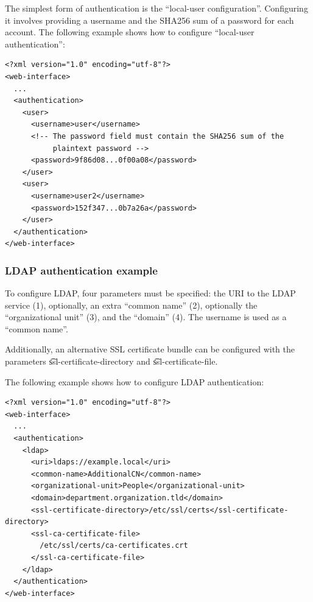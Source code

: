   The simplest form of authentication is the ``local-user configuration''.
  Configuring it involves providing a username and the SHA256 sum of a password
  for each account.  The following example shows how to configure
  ``local-user authentication'':

\begin{siderules}
\begin{verbatim}
<?xml version="1.0" encoding="utf-8"?>
<web-interface>
  ...
  <authentication>
    <user>
      <username>user</username>
      <!-- The password field must contain the SHA256 sum of the
           plaintext password -->
      <password>9f86d08...0f00a08</password>
    </user>
    <user>
      <username>user2</username>
      <password>152f347...0b7a26a</password>
    </user>
  </authentication>
</web-interface>
\end{verbatim}
\end{siderules}

\subsubsection{LDAP authentication example}

  To configure LDAP, four parameters must be specified: the URI to the LDAP
  service (1), optionally, an extra ``common name'' (2), optionally the
  ``organizational unit'' (3), and the ``domain'' (4).  The username is used
  as a ``common name''.

  \begin{sloppypar}
  Additionally, an alternative SSL certificate bundle can be configured with
  the parameters \t{ssl-certificate-directory} and
  \t{ssl-certificate-file}.
  \end{sloppypar}

  The following example shows how to configure LDAP authentication:

\begin{siderules}
\begin{verbatim}
<?xml version="1.0" encoding="utf-8"?>
<web-interface>
  ...
  <authentication>
    <ldap>
      <uri>ldaps://example.local</uri>
      <common-name>AdditionalCN</common-name>
      <organizational-unit>People</organizational-unit>
      <domain>department.organization.tld</domain>
      <ssl-certificate-directory>/etc/ssl/certs</ssl-certificate-directory>
      <ssl-ca-certificate-file>
        /etc/ssl/certs/ca-certificates.crt
      </ssl-ca-certificate-file>
    </ldap>
  </authentication>
</web-interface>
\end{verbatim}
\end{siderules}

